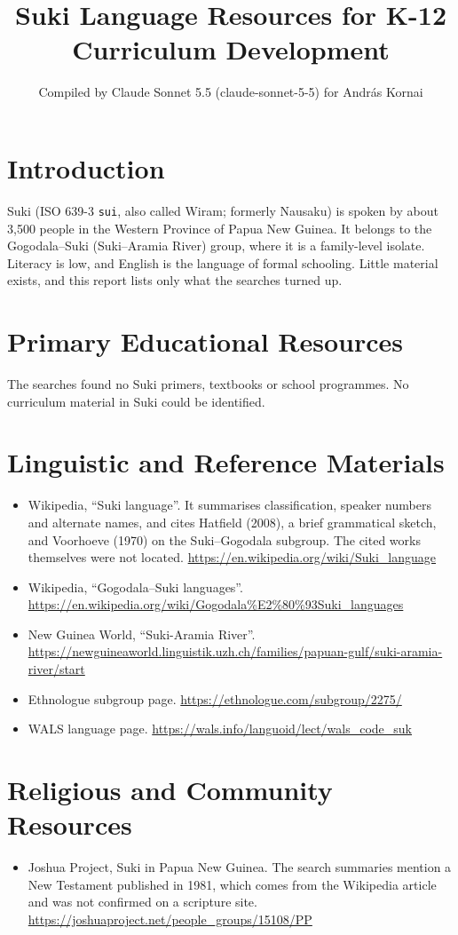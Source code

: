 \documentclass[12pt]{article}
\title{Suki Language Resources for K-12 Curriculum Development}
\author{Compiled by Claude Sonnet 5.5 (claude-sonnet-5-5) for Andr\'as Kornai}
\date{}
\begin{document}
\maketitle

\section{Introduction}
Suki (ISO 639-3 \texttt{sui}, also called Wiram; formerly Nausaku) is spoken by about 3,500 people in the Western Province of Papua New Guinea. It belongs to the Gogodala--Suki (Suki--Aramia River) group, where it is a family-level isolate. Literacy is low, and English is the language of formal schooling. Little material exists, and this report lists only what the searches turned up.

\section{Primary Educational Resources}
The searches found no Suki primers, textbooks or school programmes. No curriculum material in Suki could be identified.

\section{Linguistic and Reference Materials}
\begin{itemize}
\item Wikipedia, ``Suki language''. It summarises classification, speaker numbers and alternate names, and cites Hatfield (2008), a brief grammatical sketch, and Voorhoeve (1970) on the Suki--Gogodala subgroup. The cited works themselves were not located. \url{https://en.wikipedia.org/wiki/Suki_language}
\item Wikipedia, ``Gogodala--Suki languages''. \url{https://en.wikipedia.org/wiki/Gogodala%E2%80%93Suki_languages}
\item New Guinea World, ``Suki-Aramia River''. \url{https://newguineaworld.linguistik.uzh.ch/families/papuan-gulf/suki-aramia-river/start}
\item Ethnologue subgroup page. \url{https://ethnologue.com/subgroup/2275/}
\item WALS language page. \url{https://wals.info/languoid/lect/wals_code_suk}
\end{itemize}

\section{Religious and Community Resources}
\begin{itemize}
\item Joshua Project, Suki in Papua New Guinea. The search summaries mention a New Testament published in 1981, which comes from the Wikipedia article and was not confirmed on a scripture site. \url{https://joshuaproject.net/people_groups/15108/PP}
\end{itemize}
\end{document}
